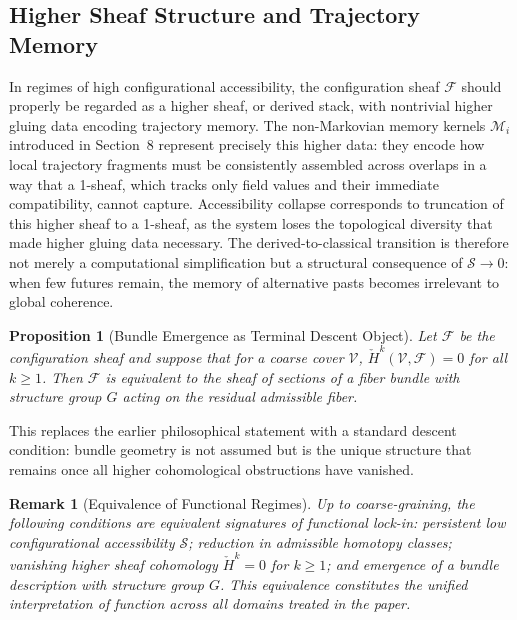 \documentclass[11pt, a4paper, twocolumn]{article}
\newtheorem{proposition}[definition]{Proposition}
\newtheorem{remark}[definition]{Remark}
\newcommand{\Sfield}{\mathcal{S}}
\begin{document}
\subsection{Higher Sheaf Structure and Trajectory Memory}

In regimes of high configurational accessibility, the configuration sheaf
$\mathcal{F}$ should properly be regarded as a higher sheaf, or derived
stack, with nontrivial higher gluing data encoding trajectory memory.
The non-Markovian memory kernels $\mathcal{M}_i$ introduced in Section~8
represent precisely this higher data: they encode how local trajectory
fragments must be consistently assembled across overlaps in a way that a
1-sheaf, which tracks only field values and their immediate compatibility,
cannot capture. Accessibility collapse corresponds to truncation of this
higher sheaf to a 1-sheaf, as the system loses the topological diversity
that made higher gluing data necessary. The derived-to-classical transition
is therefore not merely a computational simplification but a structural
consequence of $\Sfield \to 0$: when few futures remain, the memory of
alternative pasts becomes irrelevant to global coherence.

\begin{proposition}[Bundle Emergence as Terminal Descent Object]
Let $\mathcal{F}$ be the configuration sheaf and suppose that for a coarse
cover $\mathcal{V}$, $\check{H}^k(\mathcal{V},\mathcal{F}) = 0$ for all
$k \geq 1$. Then $\mathcal{F}$ is equivalent to the sheaf of sections of a
fiber bundle with structure group $G$ acting on the residual admissible fiber.
\end{proposition}

This replaces the earlier philosophical statement with a standard descent
condition: bundle geometry is not assumed but is the unique structure that
remains once all higher cohomological obstructions have vanished.

\begin{remark}[Equivalence of Functional Regimes]
Up to coarse-graining, the following conditions are equivalent signatures of
functional lock-in: persistent low configurational accessibility $\Sfield$;
reduction in admissible homotopy classes; vanishing higher sheaf cohomology
$\check{H}^k = 0$ for $k \geq 1$; and emergence of a bundle description with
structure group $G$. This equivalence constitutes the unified interpretation
of function across all domains treated in the paper.
\end{remark}
\end{document}
